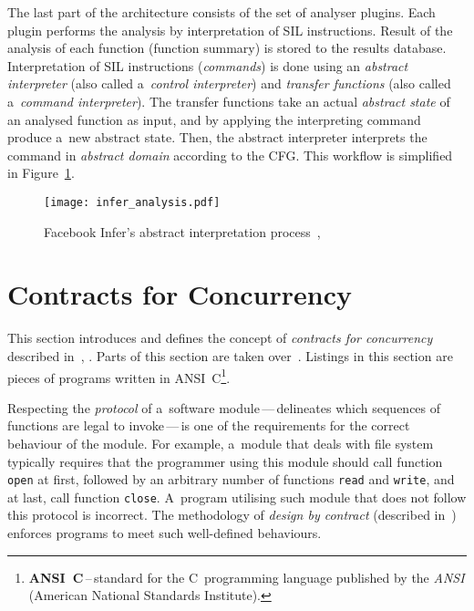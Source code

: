 The last part of the architecture consists of the set of analyser plugins. 
Each plugin performs the analysis by interpretation of SIL instructions. 
Result of the analysis of each function (function summary) is stored to 
the results database. Interpretation of SIL instructions (\emph{commands}) 
is done using an \emph{abstract interpreter} (also called a~\emph{control
interpreter}) and \emph{transfer functions} (also called a~\emph{command
interpreter}). The transfer functions take an actual \emph{abstract state} 
of an analysed function as input, and by applying the interpreting command 
produce a~new abstract state. Then, the abstract interpreter interprets the 
command in \emph{abstract domain} according to the CFG. This workflow is
simplified in Figure~\ref{fig:inferAnalysis}.

\begin{figure}[hbt]
    \centering
    \texttt{[image: infer\_analysis.pdf]}
    \caption{
        Facebook Infer's abstract interpretation 
        process~\cite{inferAISlides}, \cite{projectPracticeMarcin2018}
    }
    \label{fig:inferAnalysis}
\end{figure}


\section{Contracts for Concurrency}
\label{sec:contracts}

This section introduces and defines the concept of \emph{contracts for 
concurrency} described in~\cite{contracts2015}, \cite{contracts2017}. Parts 
of this section are taken over~\cite{excel2019FBInfer}. Listings in this
section are pieces of programs written in ANSI~C\footnote{
\textbf{ANSI~C}\,--\,standard for the C~programming language published by
the \emph{ANSI} (American National Standards Institute).}.

Respecting the \emph{protocol} of a~software module\,---\,delineates
which sequences of functions are legal to invoke\,---\,is one of the 
requirements for the correct behaviour of the module. For example, a~module
that deals with file system typically requires that the programmer using
this module should call function \texttt{open} at first, followed by an
arbitrary number of functions \texttt{read} and \texttt{write}, and at last,
call function \texttt{close}. A~program utilising such module that does
not follow this protocol is incorrect. The methodology of \emph{design by
contract} (described in~\cite{contract}) enforces programs to meet
such well-defined behaviours.~\cite{contracts2015}

